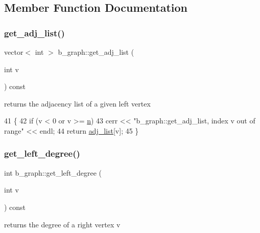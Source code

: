 \subsection{Member Function Documentation}
\mbox{\label{classb__graph_aa81c7179b9c6cb4986c4b41e84a85799}} 
\subsubsection{\texorpdfstring{get\+\_\+adj\+\_\+list()}{get\_adj\_list()}}
{\footnotesize\ttfamily vector$<$ int $>$ b\+\_\+graph\+::get\+\_\+adj\+\_\+list (\begin{DoxyParamCaption}\item[{int}]{v }\end{DoxyParamCaption}) const}



returns the adjacency list of a given left vertex 


\begin{DoxyCode}
41 \{
42   \textcolor{keywordflow}{if} (v < 0 or v >= \hyperlink{classb__graph_a9e211d40c1799bc9b125de472ff06642}{n})
43     cerr << \textcolor{stringliteral}{"b\_graph::get\_adj\_list, index v out of range"} << endl;
44   \textcolor{keywordflow}{return} \hyperlink{classb__graph_a2a89d2e8f958270952aab2e8769b7342}{adj\_list}[v];
45 \}
\end{DoxyCode}
\mbox{\label{classb__graph_ac64ac5cb1197d8008e07babc333eb3ea}} 
\subsubsection{\texorpdfstring{get\+\_\+left\+\_\+degree()}{get\_left\_degree()}}
{\footnotesize\ttfamily int b\+\_\+graph\+::get\+\_\+left\+\_\+degree (\begin{DoxyParamCaption}\item[{int}]{v }\end{DoxyParamCaption}) const}



returns the degree of a right vertex v 


